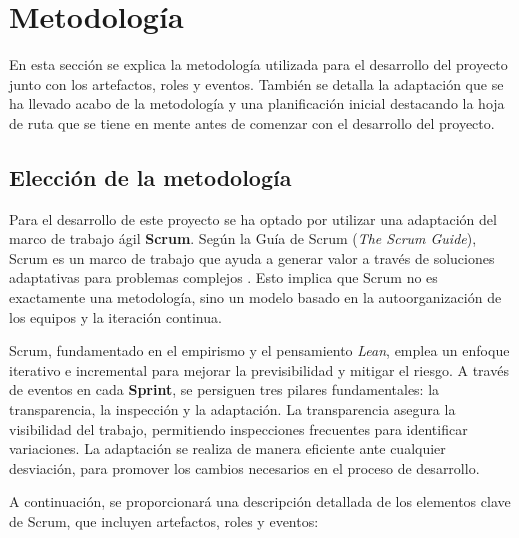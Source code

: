 \section{Metodología} 
En esta sección se explica la metodología utilizada para el desarrollo del proyecto junto con los artefactos, roles y eventos. También se detalla la adaptación que se ha llevado acabo de la metodología y una planificación inicial destacando la hoja de ruta que se tiene en mente antes de comenzar con el desarrollo del proyecto.

\subsection{Elección de la metodología} 
Para el desarrollo de este proyecto se ha optado por utilizar una adaptación del marco de trabajo ágil \textbf{Scrum}. Según la Guía de Scrum (\textit{The Scrum Guide}), Scrum es un marco de trabajo que ayuda a generar valor a través de soluciones adaptativas para problemas complejos \cite{ScrumGuide}. Esto implica que Scrum no es exactamente una metodología, sino un modelo basado en la autoorganización de los equipos y la iteración continua.

Scrum, fundamentado en el empirismo y el pensamiento \textit{Lean}, emplea un enfoque iterativo e incremental para mejorar la previsibilidad y mitigar el riesgo. A través de eventos en cada \textbf{Sprint}, se persiguen tres pilares fundamentales: la transparencia, la inspección y la adaptación. La transparencia asegura la visibilidad del trabajo, permitiendo inspecciones frecuentes para identificar variaciones. La adaptación se realiza de manera eficiente ante cualquier desviación, para promover los cambios necesarios en el proceso de desarrollo.

A continuación, se proporcionará una descripción detallada de los elementos clave de Scrum, que incluyen artefactos, roles y eventos:

